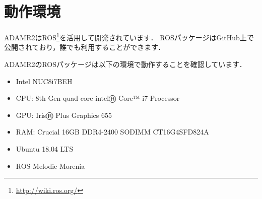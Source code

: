 \documentclass[{../../master}]{subfiles}
\begin{document}
\section{動作環境}

ADAMR2はROS\footnote{\url{http://wiki.ros.org/}}を活用して開発されています．
ROSパッケージはGitHub上で公開されており，誰でも利用することができます．

ADAMR2のROSパッケージは以下の環境で動作することを確認しています．

\begin{itemize}
  \item Intel NUC8i7BEH
  \item CPU: 8th Gen quad-core intelⓇ Core™ i7 Processor
  \item GPU: IrisⓇ Plus Graphics 655
  \item RAM: Crucial 16GB DDR4-2400 SODIMM CT16G4SFD824A
  \item Ubuntu 18.04 LTS
  \item ROS Melodic Morenia
\end{itemize}
\end{document}
